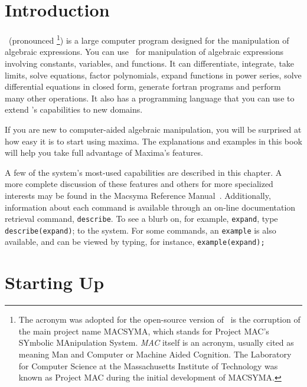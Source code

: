\label{primer}
\section{Introduction}

\Max\ (pronounced \maxp\footnote{The acronym was adopted for the open-source version of \Max\ is the corruption of the main project name MACSYMA, which  stands for Project MAC's 
SYmbolic MAnipulation System. {\it MAC} itself is an acronym, usually 
cited as meaning Man and Computer or Machine Aided Cognition. The
Laboratory for Computer Science at the Massachusetts Institute of Technology
was known as Project MAC during the initial development of MACSYMA.})
is a large computer program designed for the manipulation
of algebraic expressions. You can use \Max\
for manipulation of algebraic expressions involving
constants, variables, and functions. It can
differentiate, integrate, take limits, solve equations,
factor polynomials, expand functions in power series, solve differential 
equations in closed form, generate fortran programs and perform many other
operations.  It also has a programming language that you can use to 
extend \Max's capabilities to new domains.

If you are new to computer-aided algebraic manipulation, you will be surprised 
at how easy it is to start using maxima.  The explanations and examples in this
book will help you take full advantage of Maxima's features. 

A few of the system's most-used capabilities are described in
this chapter.  A more complete discussion of these features and others
for more specialized interests may be found in the Macsyma Reference 
Manual~\cite{macsyma-ref}.
Additionally, information about each command is 
available through an on-line documentation retrieval command, {\tt describe}.
To see a blurb on, for example, {\tt expand}, type {\tt describe(expand)};
to the system. For some commands, an {\tt example} is also available, 
and can be viewed by typing, for instance, {\tt example(expand);}

\section{Starting Up}

